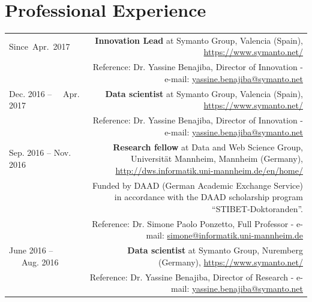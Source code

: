 \documentclass[10pt]{article}
\begin{document}
\section*{Professional Experience}
\begin{tabular}{L!{\VRule}R}

Since~Apr.~2017 &{\textbf{Innovation Lead} at Symanto Group, Valencia (Spain), \url{https://www.symanto.net/}}\\
&\scriptsize{Reference: Dr. Yassine Benajiba, Director of Innovation - e-mail: \href{mailto:yassine.benajiba@symanto.net}{yassine.benajiba@symanto.net}}\\

Dec. 2016 -- ~~Apr. 2017 ~~&{\textbf{Data scientist} at Symanto Group, Valencia (Spain), \url{https://www.symanto.net/}}\\
&\scriptsize{Reference: Dr. Yassine Benajiba, Director of Innovation - e-mail: \href{mailto:yassine.benajiba@symanto.net}{yassine.benajiba@symanto.net}}\\


 Sep. 2016 -- Nov. 2016 ~~&{\textbf{Research fellow} at Data and Web Science Group, Universit{\"a}t Mannheim, Mannheim (Germany), \url{http://dws.informatik.uni-mannheim.de/en/home/}}\\
 &\scriptsize{Funded by DAAD (German Academic Exchange Service) in accordance with the DAAD scholarship program ``STIBET-Doktoranden''.}\\
 &\scriptsize{Reference: Dr. Simone Paolo Ponzetto, Full Professor - e-mail: \href{mailto:simone@informatik.uni-mannheim.de}{simone@informatik.uni-mannheim.de}}\\

June 2016 -- ~~~Aug. 2016 ~~&{\textbf{Data scientist} at Symanto Group, Nuremberg (Germany), \url{https://www.symanto.net/}}\\
&\scriptsize{Reference: Dr. Yassine Benajiba, Director of Research - e-mail: \href{mailto:yassine.benajiba@symanto.net}{yassine.benajiba@symanto.net}}\\


\end{tabular}
\end{document}

